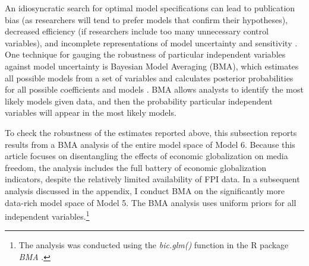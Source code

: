 \documentclass[12pt,a4paper]{article}\usepackage[]{graphicx}\usepackage[]{color}
\begin{document}
An idiosyncratic search for optimal model specifications can lead to publication bias (as researchers will tend to prefer models that confirm their hypotheses), decreased efficiency (if researchers include too many unnecessary control variables), and incomplete representations of model uncertainty and sensitivity \parencite[2]{Montgomery:2010fc}. One technique for gauging the robustness of particular independent variables against model uncertainty is Bayesian Model Averaging (BMA), which estimates all possible models from a set of variables and calculates posterior probabilities for all possible coefficients and models \parencite[4]{Montgomery:2010fc}. BMA allows analysts to identify the most likely models given data, and then the probability particular independent variables will appear in the most likely models.

To check the robustness of the estimates reported above, this subsection reports results from a BMA analysis of the entire model space of Model 6. Because this article focuses on disentangling the effects of economic globalization on media freedom, the analysis includes the full battery of economic globalization indicators, despite the relatively limited availability of FPI data. In a subsequent analysis discussed in the appendix, I conduct BMA on the significantly more data-rich model space of Model 5. The BMA analysis uses uniform priors for all independent variables.\footnote{The analysis was conducted using the \emph{bic.glm()} function in the R package \emph{BMA} \parencite{BMABayesianModel:us}.}
\end{document}
